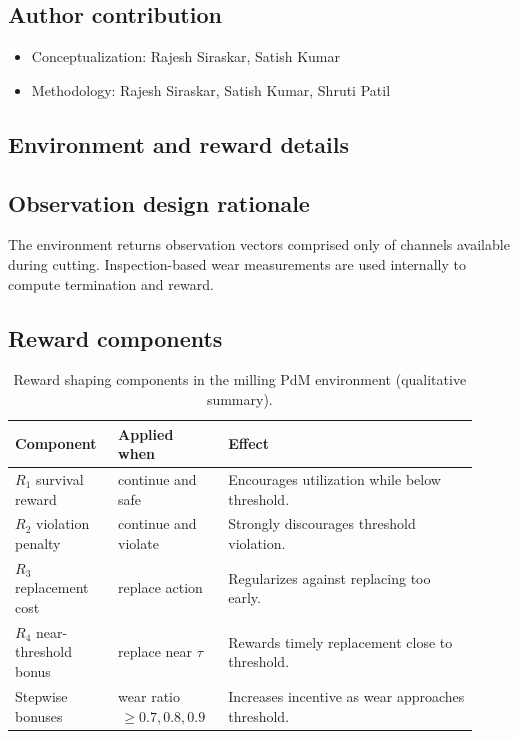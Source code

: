\documentclass[sn-basic]{sn-jnl} %
\begin{document}
\subsection*{Author contribution}
\begin{itemize}
        \item Conceptualization: Rajesh Siraskar, Satish Kumar
        \item Methodology: Rajesh Siraskar, Satish Kumar, Shruti Patil
\end{itemize}

\begin{appendices}

\section{Environment and reward details}
\label{app:env_reward}
\subsection{Observation design rationale}
The environment returns observation vectors comprised only of channels available during cutting. Inspection-based wear measurements are used internally to compute termination and reward.

\subsection{Reward components}
\begin{table}[t]
        \centering
        \caption{Reward shaping components in the milling PdM environment (qualitative summary).}
        \label{tab:reward_components}
        \begin{tabular}{p{0.20\linewidth} p{0.22\linewidth} p{0.50\linewidth}}
                \toprule
                \textbf{Component} & \textbf{Applied when} & \textbf{Effect}\\
                \midrule
                $R_1$ survival reward & continue and safe & Encourages utilization while below threshold.\\
                $R_2$ violation penalty & continue and violate & Strongly discourages threshold violation.\\
                $R_3$ replacement cost & replace action & Regularizes against replacing too early.\\
                $R_4$ near-threshold bonus & replace near $\tau$ & Rewards timely replacement close to threshold.\\
                Stepwise bonuses & wear ratio $\,\ge 0.7, 0.8, 0.9$ & Increases incentive as wear approaches threshold.\\
                \bottomrule
        \end{tabular}
\end{table}


\end{appendices}
\end{document}
